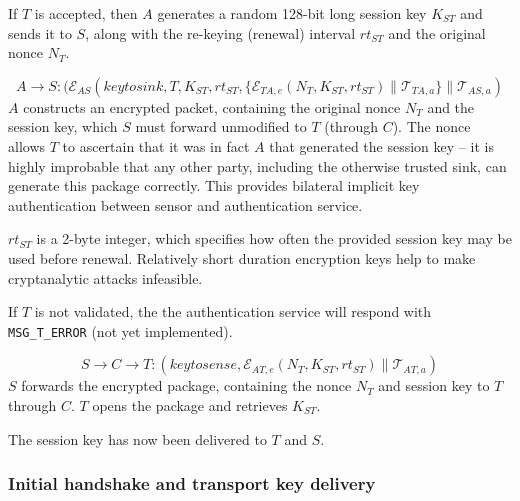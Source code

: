 If $T$ is accepted, then $A$ generates a random 128-bit long session key $K_{ST}$ and
sends it to $S$, along with the re-keying (renewal) interval $rt_{ST}$ and the
original nonce $N_T$. 

\[
A \rightarrow S: (\mathcal{E}_{AS}(keytosink,T,K_{ST},rt_{ST}, \{
\mathcal{E}_{TA,e}(N_T,K_{ST},rt_{ST}) \parallel \mathcal{T}_{TA,a}
\} \parallel \mathcal{T}_{AS,a})
\]
%
$A$ constructs an encrypted packet, containing the original nonce $N_T$ and the session key, 
which $S$ must forward unmodified to $T$ (through $C$). The nonce allows $T$ to ascertain that
it was in fact $A$ that generated the session key -- it is highly improbable that any other party,
including the otherwise trusted sink, can generate this package correctly. This provides bilateral implicit key authentication
\cite[pp.498]{menzes1996} between sensor and authentication service.

%
$rt_{ST}$ is a 2-byte integer, which specifies how often the provided session key 
may be used before renewal. Relatively short duration encryption keys help to make cryptanalytic attacks infeasible.


If $T$ is not validated, the the authentication service will respond with \texttt{MSG\_T\_ERROR} (not yet
implemented).

\[
S \rightarrow C \rightarrow T: (keytosense,\mathcal{E}_{AT,e}(N_T,K_{ST},rt_{ST}) \parallel \mathcal{T}_{AT,a})
\]
%
$S$ forwards the encrypted package, containing the nonce $N_T$ and session
key to $T$ through $C$. $T$ opens the package and retrieves $K_{ST}$.


The session key has now been delivered to $T$ and $S$.

\subsubsection{Initial handshake and transport key delivery}

